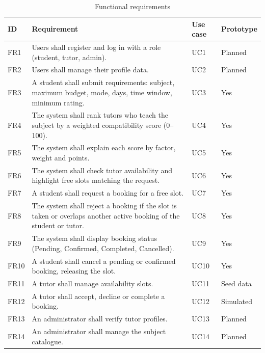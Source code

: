 \documentclass[11pt,a4paper]{article}
\begin{document}
\begin{table}[H]
\centering
\caption{Functional requirements}
\small
\begin{tabularx}{\linewidth}{@{}l X l l@{}}
\toprule
\textbf{ID} & \textbf{Requirement} & \textbf{Use case} & \textbf{Prototype}\\ \midrule
FR1 & Users shall register and log in with a role (student, tutor, admin). & UC1 & Planned\\
FR2 & Users shall manage their profile data. & UC2 & Planned\\
FR3 & A student shall submit requirements: subject, maximum budget, mode, days, time window, minimum rating. & UC3 & Yes\\
FR4 & The system shall rank tutors who teach the subject by a weighted compatibility score (0--100). & UC4 & Yes\\
FR5 & The system shall explain each score by factor, weight and points. & UC5 & Yes\\
FR6 & The system shall check tutor availability and highlight free slots matching the request. & UC6 & Yes\\
FR7 & A student shall request a booking for a free slot. & UC7 & Yes\\
FR8 & The system shall reject a booking if the slot is taken or overlaps another active booking of the student or tutor. & UC8 & Yes\\
FR9 & The system shall display booking status (Pending, Confirmed, Completed, Cancelled). & UC9 & Yes\\
FR10 & A student shall cancel a pending or confirmed booking, releasing the slot. & UC10 & Yes\\
FR11 & A tutor shall manage availability slots. & UC11 & Seed data\\
FR12 & A tutor shall accept, decline or complete a booking. & UC12 & Simulated\\
FR13 & An administrator shall verify tutor profiles. & UC13 & Planned\\
FR14 & An administrator shall manage the subject catalogue. & UC14 & Planned\\
\bottomrule
\end{tabularx}
\end{table}
\end{document}
